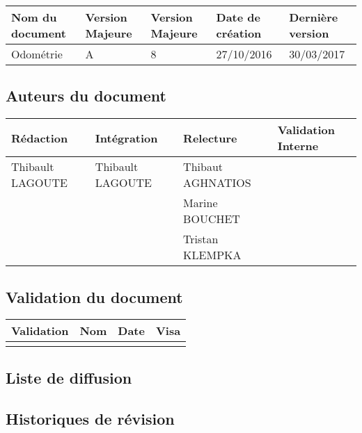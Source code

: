 \documentclass[10pt,a4paper]{article}
\begin{document}
\begin{center}
    \begin{tabular}{| l | l | l | l | l |}
    \hline
    \rowcolor{gray} Nom du document & Version Majeure & Version Majeure & Date de création & Dernière version \\ \hline
    Odométrie & A & 8 & 27/10/2016 & 30/03/2017 \\ \hline
    \end{tabular}
\end{center}


\subsection*{Auteurs du document}

\begin{center}
    \begin{tabular}{| l | l | l | l |}
    \hline
    \rowcolor{gray} Rédaction & Intégration & Relecture & Validation Interne \\ \hline
    Thibault LAGOUTE & Thibault LAGOUTE & Thibaut AGHNATIOS &  \\ 
     &  & Marine BOUCHET &  \\ 
     &   & Tristan KLEMPKA  &  \\ \hline
    \end{tabular}
\end{center}

\subsection*{Validation du document}

\begin{center}
    \begin{tabular}{| l | l | l | l |}
    \hline
     \rowcolor{gray} Validation & Nom & Date & Visa \\ \hline
    & & & \\
     \hline
    \end{tabular}
\end{center}

\subsection*{Liste de diffusion}


\subsection*{Historiques de révision}
\end{document}
